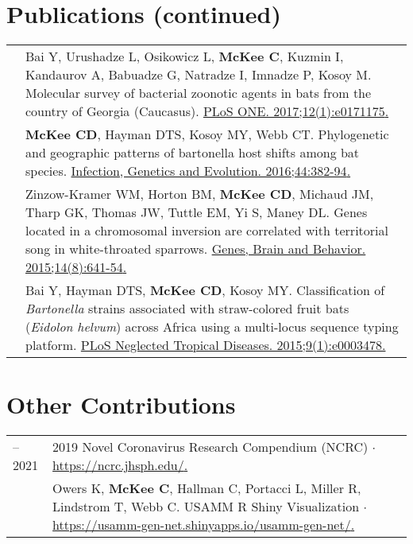 \documentclass[letterpaper]{deedy-resume} %
\begin{document}
\section{Publications (continued)}
\begin{tabular}{>{\raggedright\arraybackslash}p{2cm}p{16cm}}

2017 & Bai Y, Urushadze L, Osikowicz L, \textbf{McKee C}, Kuzmin I, Kandaurov A, Babuadze G, Natradze I, Imnadze P, Kosoy M. Molecular survey of bacterial zoonotic agents in bats from the country of Georgia (Caucasus). \href{https://doi.org/10.1371/journal.pone.0171175}{\textcolor{special}{PLoS ONE. 2017;12(1):e0171175}.} \\

2016 & \textbf{McKee CD}, Hayman DTS, Kosoy MY, Webb CT. Phylogenetic and geographic patterns of bartonella host shifts among bat species. \href{https://doi.org/10.1016/j.meegid.2016.07.033}{\textcolor{special}{Infection, Genetics and Evolution. 2016;44:382-94}.} \\

2015 & Zinzow-Kramer WM, Horton BM, \textbf{McKee CD}, Michaud JM, Tharp GK, Thomas JW, Tuttle EM, Yi S, Maney DL. Genes located in a chromosomal inversion are correlated with territorial song in white-throated sparrows. \href{https://doi.org/10.1111/gbb.12252}{\textcolor{special}{Genes, Brain and Behavior. 2015;14(8):641-54}.} \\

2015 & Bai Y, Hayman DTS, \textbf{McKee CD}, Kosoy MY. Classification of \textit{Bartonella} strains associated with straw-colored fruit bats (\textit{Eidolon helvum}) across Africa using a multi-locus sequence typing platform. \href{https://doi.org/10.1371/journal.pntd.0003478}{\textcolor{special}{PLoS Neglected Tropical Diseases. 2015;9(1):e0003478}.} \\

\end{tabular}
\sectionspace


\section{Other Contributions}
\begin{tabular}{>{\raggedright\arraybackslash}p{2cm}p{16cm}}
2020–2021 & 2019 Novel Coronavirus Research Compendium (NCRC) $\cdot$ \href{https://ncrc.jhsph.edu/}{\textcolor{special}{https://ncrc.jhsph.edu/}.} \\

2015 & Owers K, \textbf{McKee C}, Hallman C, Portacci L, Miller R, Lindstrom T, Webb C. USAMM R Shiny Visualization $\cdot$ \href{https://usamm-gen-net.shinyapps.io/usamm-gen-net/}{\textcolor{special}{https://usamm-gen-net.shinyapps.io/usamm-gen-net/}.} \\
\end{tabular}
\sectionspace
\end{document}
